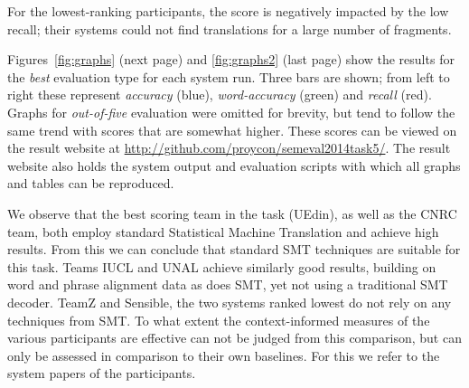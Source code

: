 For the lowest-ranking participants, the score is negatively impacted by the low recall; their systems could not find translations for a large number of fragments.

Figures~\ref{fig:graphs} (next page) and \ref{fig:graphs2} (last page) show the
results for the \emph{best} evaluation type for each system run. Three bars are
shown; from left to right these represent \emph{accuracy} (blue),
\emph{word-accuracy} (green) and \emph{recall} (red). Graphs for
\emph{out-of-five} evaluation were omitted for brevity, but tend to follow the
same trend with scores that are somewhat higher. These scores can be viewed on
the result website at \url{http://github.com/proycon/semeval2014task5/}. The
result website also holds the system output and evaluation scripts with which
all graphs and tables can be reproduced.

We observe that the best scoring team in the task (UEdin), as well as the CNRC
team, both employ standard Statistical Machine Translation and achieve high
results. From this we can conclude that standard SMT techniques are suitable
for this task. Teams IUCL and UNAL achieve similarly good results, building on
word and phrase alignment data as does SMT, yet not using a traditional SMT
decoder. TeamZ and Sensible, the two systems ranked lowest do not rely on any
techniques from SMT. To what extent the context-informed measures of the
various participants are effective can not be judged from this comparison, but
can only be assessed in comparison to their own baselines. For this we refer to
the system papers of the participants.


